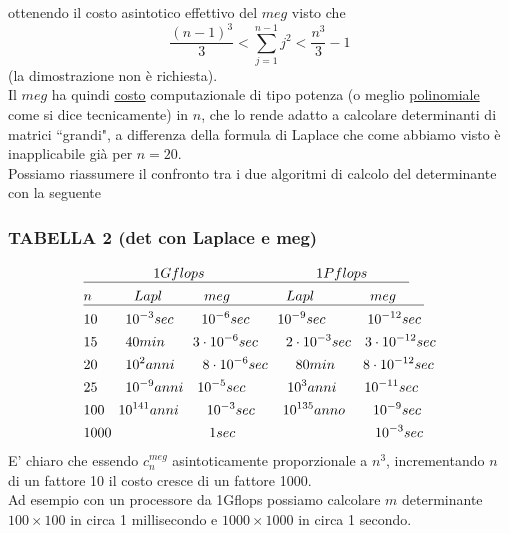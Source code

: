 ottenendo il costo asintotico effettivo del $meg$ visto che
\begin{equation*}
    \frac{(n-1)^3}{3}<\sum_{j=1}^{n-1}j^2<\frac{n^3}{3}-1
\end{equation*}
(la dimostrazione non è richiesta).\\Il $meg$ ha quindi \uline{costo} computazionale di tipo potenza (o meglio \uline{polinomiale} come si dice tecnicamente) in $n$, che lo rende adatto a calcolare determinanti di matrici ``grandi", a differenza della formula di Laplace che come abbiamo visto è inapplicabile già per $n=20$.\\Possiamo riassumere il confronto tra i due algoritmi di calcolo del determinante con la seguente

\subsubsection{TABELLA 2 (det con Laplace e meg)}
\[ \begin{split}
	& \uline{\quad\quad\quad\quad \quad1Gflops\quad\quad \quad\quad\quad\quad\quad\quad1Pflops \quad\quad\quad }\\
	& \uline{n\quad\quad\quad Lapl\quad\quad\quad meg\quad\quad\quad\quad Lapl\quad\quad\quad\quad meg\quad\quad}\\
	&  10\quad\quad 10^{-3}sec\quad\quad 10^{-6}sec\quad\quad 10^{-9}sec\quad\quad\quad 10^{-12}sec\\
	&  15\quad\quad 40min\quad\quad 3\cdot10^{-6}sec\quad\quad 2\cdot10^{-3}sec\quad 3\cdot10^{-12}sec\\
	& 20\quad\quad 10^{2}anni\quad\quad 8\cdot10^{-6}sec\quad\quad 80min\quad\quad 8\cdot10^{-12}sec\\
	& 25\quad\quad 10^{-9}anni\quad 10^{-5}sec\quad\quad\quad 10^3anni\quad\quad 10^{-11}sec\\
	& 100\quad 10^{141}anni\quad\quad 10^{-3}sec\quad\quad 10^{135}anno\quad\quad 10^{-9}sec\\ 
	& 1000\quad\quad \quad\quad\quad\quad\quad 1sec\quad\quad\quad \quad\quad\quad\quad\quad\quad\quad10^{-3}sec\\ 
\end{split} \]
E' chiaro che essendo $c_n^{meg}$ asintoticamente proporzionale a $n^3$, incrementando $n$ di un fattore 10 il costo cresce di un fattore 1000.\\Ad esempio con un processore da 1Gflops possiamo calcolare $m$ determinante $100\times 100$ in circa 1 millisecondo e $1000\times 1000$ in circa 1 secondo.
\newpage